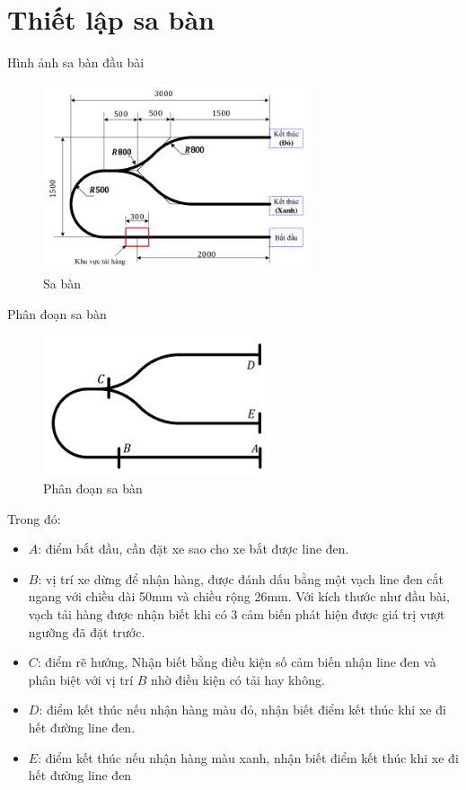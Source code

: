      \section{Thiết lập sa bàn}
          \hspace*{0.6cm}Hình ảnh sa bàn đầu bài
          \begin{figure}[H]
               \centering
               \includegraphics[width=0.7\textwidth]{pictures/chapter7/saban.png}
               \caption{Sa bàn}
               \label{race}
          \end{figure}
          \hspace*{0.6cm}Phân đoạn sa bàn
          \begin{figure}[H]
               \centering
               \includegraphics[width=0.6\textwidth]{pictures/chapter7/cut_saban.png}
               \caption{Phân đoạn sa bàn}
               \label{cut_race}
          \end{figure}
          \hspace*{0.6cm}Trong đó:
          \begin{itemize}
               \item $A$: điểm bắt đầu, cần đặt xe sao cho xe bắt được line đen.
               \item $B$: vị trí xe dừng để nhận hàng, được đánh dấu bằng một vạch line đen cắt
               ngang với chiều dài 50mm và chiều rộng 26mm. Với kích thước như đầu bài, vạch tải
               hàng được nhận biết khi có 3 cảm biến phát hiện được giá trị vượt ngưỡng đã đặt trước.
               \item $C$: điểm rẽ hướng, Nhận biết bằng điều kiện số cảm biến nhận line đen và phân biệt với vị trí $B$ nhờ điều kiện có tải hay không.
               \item $D$: điểm kết thúc nếu nhận hàng màu đỏ, nhận biết điểm kết thúc khi xe đi hết đường line đen.
               \item $E$: điểm kết thúc nếu nhận hàng màu xanh, nhận biết điểm kết thúc khi xe đi hết đường line đen
          \end{itemize}
